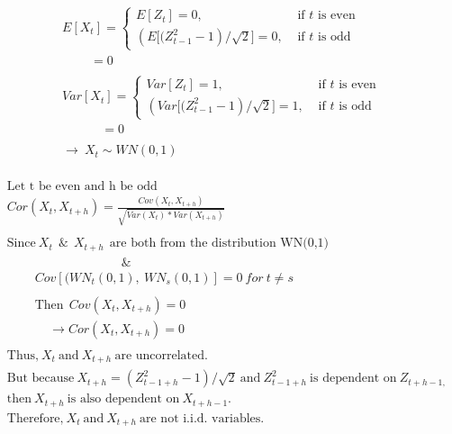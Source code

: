\documentclass[
]{article}
\begin{document}
\[
\begin{align*}
&E[X_{t}] = \begin{cases}E[Z_t] = 0, & \text { if } t \text { is even } \\ \left(E[(Z_{t-1}^2-1\right) / \sqrt{2}] = 0, & \text { if } t \text { is odd }\end{cases}\\
& \ \ \ \ \ \ \ \ \ \ = 0\\ \\
&Var[X_{t}] = \begin{cases}Var[Z_t] = 1, & \text { if } t \text { is even } \\ \left(Var[(Z_{t-1}^2-1\right) / \sqrt{2}] = 1, & \text { if } t \text { is odd }\end{cases}\\
& \ \ \ \ \ \ \ \ \ \ \ \ \ \ = 0\\ \\
& \rightarrow\ X_{t} \sim WN(0,1)
\end{align*}
\]\\

\[
\begin{align*}
& \text{Let t be even and h be odd} \\
&Cor(X_{t}, X_{t+h}) = \frac{Cov(X_{t}, X_{t+h})}{\sqrt{Var(X_{t})*Var(X_{t+h})}}\\ \\
&\text{Since}\ X_{t}\ \ \&\ \ X_{t+h}\ \ \text{are both from the distribution WN(0,1)} \\
& \ \ \ \ \ \ \ \ \ \ \ \ \ \ \ \ \ \ \ \ \ \ \ \ \ \ \ \ \ \ \ \ \ \ \ \ \ \ \ \ \ \& \\
& \ \ \ \ \ \ \ \ \ \ Cov[(WN_{t}(0,1),\ WN_{s}(0,1)]=0\ for\ t \ne s\ \\ \\
& \ \ \ \ \ \ \ \ \ \ \text{Then}\ \ Cov(X_{t}, X_{t+h})=0 \\
& \ \ \ \ \ \ \ \ \ \ \ \ \ \ \ \rightarrow Cor(X_{t}, X_{t+h}) = 0\\ \\
&\text{Thus,}\ X_{t}\ \text{and}\ X_{t+h}\ \text{are uncorrelated}.\\
&\text{But because}\ X_{t+h} = (Z^2_{t-1+h}-1)/\sqrt{2}\ \text{and}\ Z^2_{t-1+h}\ \text{is dependent on}\ Z_{t+h-1,}\\
&\text{then}\ X_{t+h}\ \text{is also dependent on}\ X_{t+h-1}. \\
&\text{Therefore,}\ X_{t}\ \text{and}\ X_{t+h}\ \text{are not i.i.d. variables.}
\end{align*}
\] ~\\
\end{document}
